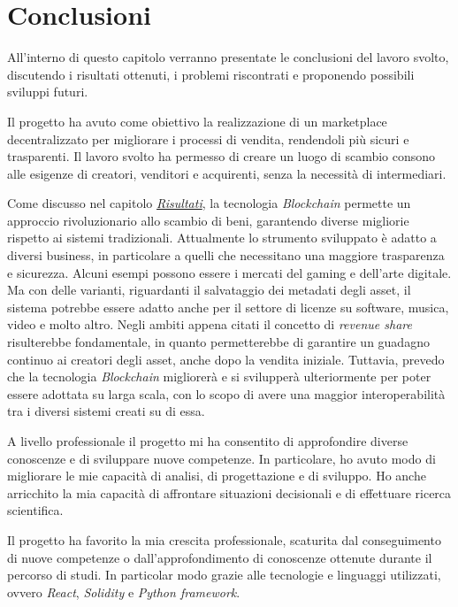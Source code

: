 \chapter{Conclusioni}

All'interno di questo capitolo verranno presentate le conclusioni del lavoro svolto, discutendo i risultati ottenuti, i problemi riscontrati e proponendo possibili sviluppi futuri.

Il progetto ha avuto come obiettivo la realizzazione di un marketplace decentralizzato per migliorare i processi di vendita, rendendoli più sicuri e trasparenti. Il lavoro svolto ha permesso di creare un luogo di scambio consono alle esigenze di creatori, venditori e acquirenti, senza la necessità di intermediari.

Come discusso nel capitolo \hyperref[sec:risultati]{\textit{Risultati}}, la tecnologia \textit{Blockchain} permette un approccio rivoluzionario allo scambio di beni, garantendo diverse migliorie rispetto ai sistemi tradizionali. Attualmente lo strumento sviluppato è adatto a diversi business, in particolare a quelli che necessitano una maggiore trasparenza e sicurezza. Alcuni esempi possono essere i mercati del gaming e dell'arte digitale. Ma con delle varianti, riguardanti il salvataggio dei metadati degli asset, il sistema potrebbe essere adatto anche per il settore di licenze su software, musica, video e molto altro. Negli ambiti appena citati il concetto di \textit{revenue share} risulterebbe fondamentale, in quanto permetterebbe di garantire un guadagno continuo ai creatori degli asset, anche dopo la vendita iniziale. Tuttavia, prevedo che la tecnologia \textit{Blockchain} migliorerà e si svilupperà ulteriormente per poter essere adottata su larga scala, con lo scopo di avere una maggior interoperabilità tra i diversi sistemi creati su di essa.

A livello professionale il progetto mi ha consentito di approfondire diverse conoscenze e di sviluppare nuove competenze. In particolare, ho avuto modo di migliorare le mie capacità di analisi, di progettazione e di sviluppo. Ho anche arricchito la mia capacità di affrontare situazioni decisionali e di effettuare ricerca scientifica. 

Il progetto ha favorito la mia crescita professionale, scaturita dal conseguimento di nuove competenze o dall'approfondimento di conoscenze ottenute durante il percorso di studi. In particolar modo grazie alle tecnologie e linguaggi utilizzati, ovvero \textit{React}, \textit{Solidity} e \textit{Python framework}.

